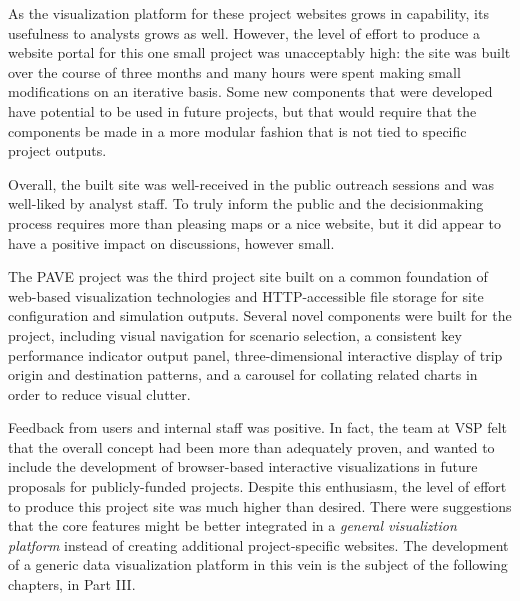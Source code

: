 As the visualization platform for these project websites grows in capability, its usefulness to analysts grows as well. However, the level of effort to produce a website portal for this one small project was unacceptably high: the site was built over the course of three months and many hours were spent making small modifications on an iterative basis. Some new components that were developed have potential to be used in future projects, but that would require that the components be made in a more modular fashion that is not tied to specific project outputs.

Overall, the built site was well-received in the public outreach sessions and was well-liked by analyst staff. To truly inform the public and the decisionmaking process requires more than pleasing maps or a nice website, but it did appear to have a positive impact on discussions, however small.

The PAVE project was the third project site built on a common foundation of web-based visualization technologies and HTTP-accessible file storage for site configuration and simulation outputs. Several novel components were built for the project, including visual navigation for scenario selection, a consistent key performance indicator output panel, three-dimensional interactive display of trip origin and destination patterns, and a carousel for collating related charts in order to reduce visual clutter.

Feedback from users and internal staff was positive. In fact, the team at VSP felt that the overall concept had been more than adequately proven, and wanted to include the development of browser-based interactive visualizations in future proposals for publicly-funded projects. Despite this enthusiasm, the level of effort to produce this project site was much higher than desired. There were suggestions that the core features might be better integrated in a \emph{general visualiztion platform} instead of creating additional project-specific websites. The development of a generic data visualization platform in this vein is the subject of the following chapters, in Part III.
